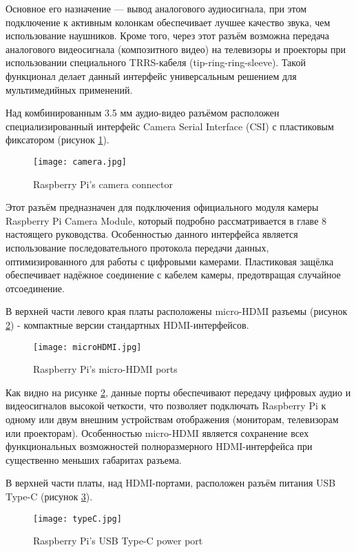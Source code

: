 Основное его назначение — вывод аналогового аудиосигнала, при этом подключение к активным колонкам обеспечивает лучшее качество звука, чем использование наушников. Кроме того, через этот разъём возможна передача аналогового видеосигнала (композитного видео) на телевизоры и проекторы при использовании специального TRRS-кабеля (tip-ring-ring-sleeve). Такой функционал делает данный интерфейс универсальным решением для мультимедийных применений.

Над комбинированным 3.5 мм аудио-видео разъёмом расположен специализированный интерфейс Camera Serial Interface (CSI) с пластиковым фиксатором (рисунок \ref{fig:camera}).

\begin{figure}[H]
	\centering
	\texttt{[image: camera.jpg]}
	\caption{Raspberry Pi’s camera connector}
	\label{fig:camera}
\end{figure}

Этот разъём предназначен для подключения официального модуля камеры Raspberry Pi Camera Module, который подробно рассматривается в главе 8 настоящего руководства. Особенностью данного интерфейса является использование последовательного протокола передачи данных, оптимизированного для работы с цифровыми камерами. Пластиковая защёлка обеспечивает надёжное соединение с кабелем камеры, предотвращая случайное отсоединение.


В верхней части левого края платы расположены micro-HDMI разъемы (рисунок \ref{fig:microHDMI}) - компактные версии стандартных HDMI-интерфейсов.

\begin{figure}[H]
	\centering
	\texttt{[image: microHDMI.jpg]}
	\caption{Raspberry Pi’s micro-HDMI ports}
	\label{fig:microHDMI}
\end{figure}

Как видно на рисунке \ref{fig:microHDMI}, данные порты обеспечивают передачу цифровых аудио и видеосигналов высокой четкости, что позволяет подключать Raspberry Pi к одному или двум внешним устройствам отображения (мониторам, телевизорам или проекторам). Особенностью micro-HDMI является сохранение всех функциональных возможностей полноразмерного HDMI-интерфейса при существенно меньших габаритах разъема.


В верхней части платы, над HDMI-портами, расположен разъём питания USB Type-C (рисунок \ref{fig:typeC}).

\begin{figure}[H]
	\centering
	\texttt{[image: typeC.jpg]}
	\caption{Raspberry Pi’s USB Type-C power port}
	\label{fig:typeC}
\end{figure}

